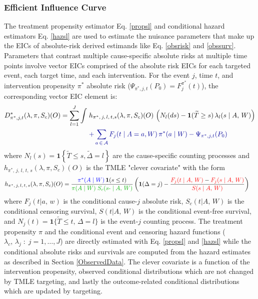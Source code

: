 \documentclass{report}
\newcommand{\1}{\ensuremath{\mathbf{1}}}
\newcommand{\T}{\ensuremath{\widetilde{T}}}
\newcommand{\X}{\ensuremath{{W}}}
\newcommand{\ax}{\ensuremath{\mid a,\,{w}}}
\newcommand{\AX}{\ensuremath{\mid A,\,{W}}}
\newcommand{\trt}{\ensuremath{\pi^*}}
\newcommand{\lj}{\ensuremath{l}}
\newcommand{\jj}{\ensuremath{j}}
\newcommand{\g}{\ensuremath{\pi}}
\newcommand{\tDelta}{\ensuremath{\widetilde{\Delta}}}
\begin{document}
\subsubsection{Efficient Influence Curve}
\label{EIC}
The treatment propensity estimator Eq. \eqref{propsl} and conditional hazard estimators Eq. \eqref{hazsl} are used to estimate the nuisance parameters that make up the EICs of absolute-risk derived estimands like Eq. \eqref{obsrisk} and \eqref{obssurv}. Parameters that contrast multiple cause-specific absolute risks at multiple time points involve vector EICs comprised of the absolute risk EICs for each targeted event, each target time, and each intervention. For the event \(\jj\), time \(t\), and intervention propensity \(\trt\) absolute risk (\(\Psi_{\trt, \jj, t}(P_0) = F_\jj^{\trt}(t)\)), the corresponding vector EIC element is:
\begin{align}
    D^*_{\trt, \jj, t}(\lambda, \g, S_c)(O) = \sum_{\lj = 1}^{J} \int \; &h_{\trt,\, \jj,\, \lj,\, t, s}(\lambda, \g, S_c)(O) \, \left(N_{\lj}(ds) - \1(\T \geq s) \, \lambda_\lj(s \AX)\right) \label{eic} \\
    &{\color{blue!60!black}+ \sum_{a\,\in\,\mathcal{A}} F_\jj(t \mid A = a, \X)\,\trt(a \mid \X) - \Psi_{\trt, \jj, t}(P_0)}  \nonumber 
\end{align}
where \(N_l(s) = \1\left\{\T \leq s, \tDelta = l\right\}\) are the cause-specific counting processes and \(h_{\trt,\, \jj,\, \lj,\, t,\, s}(\lambda, \g, S_c)(O)\) is the TMLE "clever covariate" with the form
\begin{align}
    h_{\trt,\, \jj,\, \lj,\, t,\, s}&(\lambda, \g, S_c)(O) = \frac{{\color{blue}\trt(A \mid \X)\,} \1(s \leq t)}{{\color{green!70!black}\g(A \mid \X) \;S_c(s\text{-} \AX)}} \, \bigg(\1(\Delta = \jj) - \frac{{\color{red}F_\jj(t \AX)} - {\color{red} F_\jj(s \AX)}}{{\color{red} S(s \AX)}}\bigg) \label{clevcov}
\end{align}
where \(F_j(t \ax)\) is the conditional cause-\(j\) absolute risk, \(S_c(t \AX)\) is the conditional censoring survival, \(S(t \AX)\) is the conditional event-free survival, and \(N_j(t) = \1\{\T \leq t, \, \Delta = l\}\) is the event-\(j\) counting process. The treatment propensity \(\g\) and the conditional event and censoring hazard functions ( \(\lambda_c,\, \lambda_j \;:\;  j = 1, \dots, J\)) are directly estimated with Eq. \eqref{propsl} and \eqref{hazsl} while the conditional absolute risks and survivals are computed from the hazard estimates as described in Section \ref{ObservedData}. The clever covariate is a function of the {\color{blue}intervention propensity}, {\color{green!70!black}observed conditional distributions} which are not changed by TMLE targeting, and lastly the {\color{red}outcome-related conditional distributions} which are updated by targeting.
\end{document}
